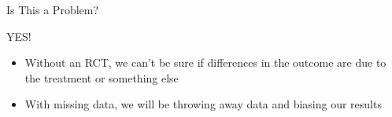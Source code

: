 \begin{frame}{Is This a Problem?}

\begin{center}
 {\Huge{YES!}}
\end{center}
  \begin{itemize}
   \item Without an RCT, we can't be sure if differences in the outcome are due to the treatment or something else
   \item With missing data, we will be throwing away data and biasing our results
  \end{itemize}


\end{frame}

